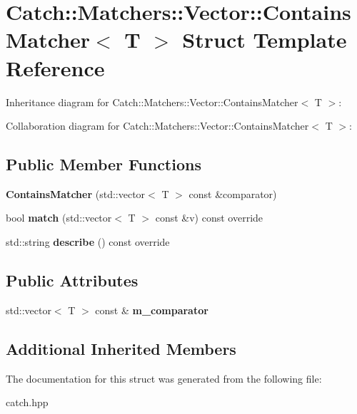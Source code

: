 \hypertarget{structCatch_1_1Matchers_1_1Vector_1_1ContainsMatcher}{}\section{Catch\+:\+:Matchers\+:\+:Vector\+:\+:Contains\+Matcher$<$ T $>$ Struct Template Reference}
\label{structCatch_1_1Matchers_1_1Vector_1_1ContainsMatcher}


Inheritance diagram for Catch\+:\+:Matchers\+:\+:Vector\+:\+:Contains\+Matcher$<$ T $>$\+:


Collaboration diagram for Catch\+:\+:Matchers\+:\+:Vector\+:\+:Contains\+Matcher$<$ T $>$\+:
\subsection*{Public Member Functions}
\begin{DoxyCompactItemize}
\item 
\mbox{\label{structCatch_1_1Matchers_1_1Vector_1_1ContainsMatcher_ad8e92c8399be6dce75bb5702cdfab700}} 
{\bfseries Contains\+Matcher} (std\+::vector$<$ T $>$ const \&comparator)
\item 
\mbox{\label{structCatch_1_1Matchers_1_1Vector_1_1ContainsMatcher_afd33467ae48a41a634572b41b053f67f}} 
bool {\bfseries match} (std\+::vector$<$ T $>$ const \&v) const override
\item 
\mbox{\label{structCatch_1_1Matchers_1_1Vector_1_1ContainsMatcher_abe6a9ea3d6506c9a1f75ff524f35832e}} 
std\+::string {\bfseries describe} () const override
\end{DoxyCompactItemize}
\subsection*{Public Attributes}
\begin{DoxyCompactItemize}
\item 
\mbox{\label{structCatch_1_1Matchers_1_1Vector_1_1ContainsMatcher_a83d051166e4ed0d535219ad6ee99abb2}} 
std\+::vector$<$ T $>$ const  \& {\bfseries m\+\_\+comparator}
\end{DoxyCompactItemize}
\subsection*{Additional Inherited Members}


The documentation for this struct was generated from the following file\+:\begin{DoxyCompactItemize}
\item 
catch.\+hpp\end{DoxyCompactItemize}
